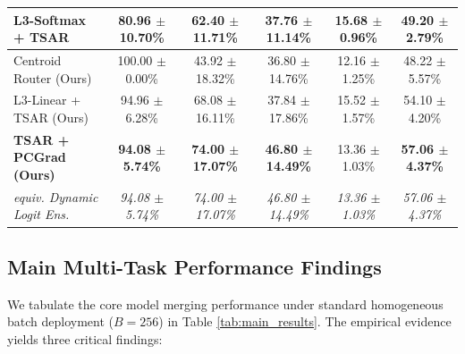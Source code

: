 \begin{table}[t]
\begin{center}
\begin{small}
\begin{sc}
\begin{tabular}{lccccc}
L3-Softmax + TSAR & 80.96 $\pm$ 10.70\% & 62.40 $\pm$ 11.71\% & 37.76 $\pm$ 11.14\% & 15.68 $\pm$
0.96\% & 49.20 $\pm$ 2.79\% \\
\midrule
Centroid Router (Ours) & 100.00 $\pm$ 0.00\% & 43.92 $\pm$ 18.32\% & 36.80 $\pm$ 14.76\% & 12.16
$\pm$ 1.25\% & 48.22 $\pm$ 5.57\% \\
L3-Linear + TSAR (Ours) & 94.96 $\pm$ 6.28\% & 68.08 $\pm$ 16.11\% & 37.84 $\pm$ 17.86\% & 15.52
$\pm$ 1.57\% & 54.10 $\pm$ 4.20\% \\
\textbf{TSAR + PCGrad (Ours)} & \textbf{94.08 $\pm$ 5.74\%} & \textbf{74.00 $\pm$ 17.07\%} & \textbf{46.80 $\pm$ 14.49\%} & 13.36 $\pm$ 1.03\% & \textbf{57.06 $\pm$ 4.37\%} \\
\quad \textit{equiv. Dynamic Logit Ens.} & \textit{94.08 $\pm$ 5.74\%} & \textit{74.00 $\pm$ 17.07\%} & \textit{46.80 $\pm$ 14.49\%} & \textit{13.36 $\pm$ 1.03\%} & \textit{57.06 $\pm$ 4.37\%} \\
\bottomrule
\end{tabular}
\end{sc}
\end{small}
\end{center}
\vskip -0.1in
\end{table}

\subsection{Main Multi-Task Performance Findings}
We tabulate the core model merging performance under standard homogeneous batch deployment
($B=256$) in Table \ref{tab:main_results}. The empirical evidence yields three critical findings:

